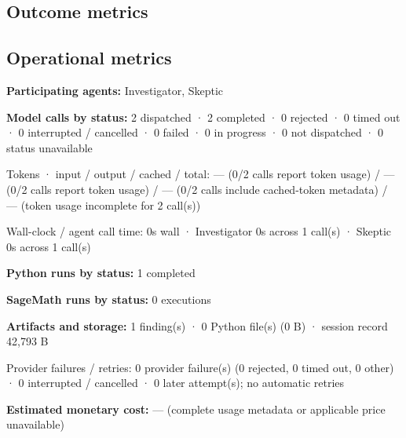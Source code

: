 \documentclass[11pt]{article}
\begin{document}
\subsection{Outcome metrics}
\subsection{Operational metrics}
\textbf{Participating agents:} Investigator, Skeptic\par
\textbf{Model calls by status:} 2 dispatched · 2 completed · 0 rejected · 0 timed out · 0 interrupted / cancelled · 0 failed · 0 in progress · 0 not dispatched · 0 status unavailable\par
Tokens · input / output / cached / total: — (0/2 calls report token usage) / — (0/2 calls report token usage) / — (0/2 calls include cached-token metadata) / — (token usage incomplete for 2 call(s))\par
Wall-clock / agent call time: 0s wall · Investigator 0s across 1 call(s) · Skeptic 0s across 1 call(s)\par
\textbf{Python runs by status:} 1 completed\par
\textbf{SageMath runs by status:} 0 executions\par
\textbf{Artifacts and storage:} 1 finding(s) · 0 Python file(s) (0 B) · session record 42,793 B\par
Provider failures / retries: 0 provider failure(s) (0 rejected, 0 timed out, 0 other) · 0 interrupted / cancelled · 0 later attempt(s); no automatic retries\par
\textbf{Estimated monetary cost:} — (complete usage metadata or applicable price unavailable)\par
\end{document}
